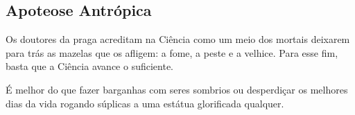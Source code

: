 \documentclass[letterpaper,twocolumn,openany]{dndbook}
\begin{document}
	\subsection{Apoteose Antrópica}
	
	Os doutores da praga acreditam na Ciência como um meio dos mortais deixarem para trás as mazelas que os afligem: a fome, a peste e a velhice. Para esse fim, basta que a Ciência avance o suficiente.
	
	É melhor do que fazer barganhas com seres sombrios ou desperdiçar os melhores dias da vida rogando súplicas a uma estátua glorificada qualquer.
\end{document}
